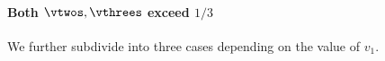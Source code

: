




\paragraph{Both $\vtwos,\vthrees$ exceed $1/3$}
We further subdivide into three cases depending on the value of $v_1$.


